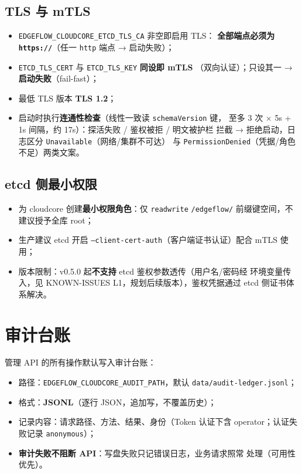 \subsection{TLS 与 mTLS}

\begin{itemize}
  \item \texttt{EDGEFLOW\_CLOUDCORE\_ETCD\_TLS\_CA} 非空即启用 TLS：
        \textbf{全部端点必须为 \texttt{https://}}（任一 \texttt{http} 端点 →
        启动失败）；
  \item \texttt{ETCD\_TLS\_CERT} 与 \texttt{ETCD\_TLS\_KEY} \textbf{同设即 mTLS}
        （双向认证）；只设其一 → \textbf{启动失败}（fail-fast）；
  \item 最低 TLS 版本 \textbf{TLS 1.2}；
  \item 启动时执行\textbf{连通性检查}（线性一致读 \texttt{schemaVersion} 键，
        至多 3 次 × 5s + 1s 间隔，约 17s）：探活失败 / 鉴权被拒 / 明文被护栏
        拦截 → 拒绝启动，日志区分 \texttt{Unavailable}（网络/集群不可达）
        与 \texttt{PermissionDenied}（凭据/角色不足）两类文案。
\end{itemize}

\subsection{etcd 侧最小权限}

\begin{itemize}
  \item 为 cloudcore 创建\textbf{最小权限角色}：仅 \texttt{readwrite}
        \texttt{/edgeflow/} 前缀键空间，不建议授予全库 root；
  \item 生产建议 etcd 开启 \texttt{--client-cert-auth}（客户端证书认证）配合
        mTLS 使用；
  \item 版本限制：v0.5.0 起\textbf{不支持} etcd 鉴权参数透传（用户名/密码经
        环境变量传入，见 KNOWN-ISSUES L1，规划后续版本），鉴权凭据通过
        etcd 侧证书体系解决。
\end{itemize}

\section{审计台账}

管理 API 的所有操作默认写入审计台账：

\begin{itemize}
  \item 路径：\texttt{EDGEFLOW\_CLOUDCORE\_AUDIT\_PATH}，默认
        \texttt{data/audit-ledger.jsonl}；
  \item 格式：\textbf{JSONL}（逐行 JSON，追加写，不覆盖历史）；
  \item 记录内容：请求路径、方法、结果、身份（Token 认证下含
        operator；认证失败记录 \texttt{anonymous}）；
  \item \textbf{审计失败不阻断 API}：写盘失败只记错误日志，业务请求照常
        处理（可用性优先）。
\end{itemize}

